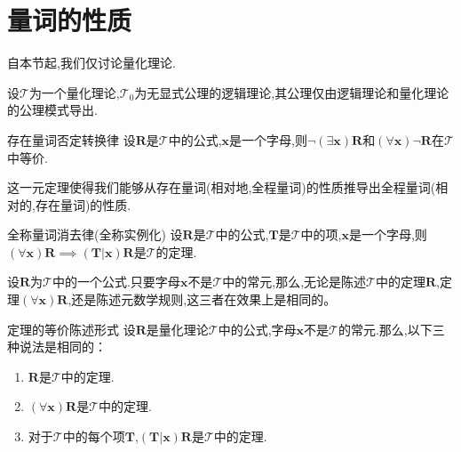 \section{量词的性质}

自本节起,我们仅讨论量化理论.

设$\mathcal{T}$为一个量化理论,$\mathcal{T}_{0}$为无显式公理的逻辑理论,其公理仅由逻辑理论和量化理论的公理模式导出.

\begin{metatheorem}{存在量词否定转换律}{}
	设$\boldsymbol{R}$是$\mathcal{T}$中的公式,$\boldsymbol{x}$是一个字母,则$\neg\left(\exists\boldsymbol{x}\right)\boldsymbol{R}$和$\left(\forall\boldsymbol{x}\right)\neg\boldsymbol{R}$在$\mathcal{T}$中等价.
\end{metatheorem}

\begin{remark}{}{}
	这一元定理使得我们能够从存在量词(相对地,全程量词)的性质推导出全程量词(相对的,存在量词)的性质.
\end{remark}

\begin{metatheorem}{全称量词消去律(全称实例化)}{}
	设$\boldsymbol{R}$是$\mathcal{T}$中的公式,$\boldsymbol{T}$是$\mathcal{T}$中的项,$\boldsymbol{x}$是一个字母,则$\left(\forall\boldsymbol{x}\right)\boldsymbol{R}\implies\left(\boldsymbol{T}|\boldsymbol{x}\right)\boldsymbol{R}$是$\mathcal{T}$的定理.
\end{metatheorem}

\begin{remark}{}{}
	设$\boldsymbol{R}$为$\mathcal{T}$中的一个公式.只要字母$\boldsymbol{x}$不是$\mathcal{T}$中的常元,那么,无论是陈述$\mathcal{T}$中的定理$\boldsymbol{R}$,定理$\left(\forall\boldsymbol{x}\right)\boldsymbol{R}$,还是陈述元数学规则,这三者在效果上是相同的。
\end{remark}

\begin{corollary}{定理的等价陈述形式}{}
	设$\boldsymbol{R}$是量化理论$\mathcal{T}$中的公式,字母$\boldsymbol{x}$不是$\mathcal{T}$的常元.那么,以下三种说法是相同的：
		\begin{enumerate}
			\item $\boldsymbol{R}$是$\mathcal{T}$中的定理.
			\item $\left(\forall\boldsymbol{x}\right)\boldsymbol{R}$是$\mathcal{T}$中的定理.
			\item 对于$\mathcal{T}$中的每个项$\boldsymbol{T}$,$\left(\boldsymbol{T}|\boldsymbol{x}\right)\boldsymbol{R}$是$\mathcal{T}$中的定理.
		\end{enumerate}	
\end{corollary}

